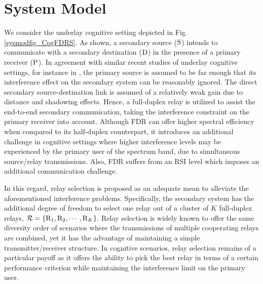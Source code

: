 \documentclass[10pt,journal]{IEEEtran}
\begin{document}
\section{System Model}
We consider the underlay cognitive setting depicted in Fig. \ref{sysmodfig_CogFDRS}. As shown, a secondary source (${\rm S}$) intends to communicate with a secondary destination (${\rm D}$) in the presence of a primary receiver (${\rm P}$). In agreement with similar recent studies of underlay cognitive settings, for instance in \cite{201102_TWC_Lee_DF}, the primary source is assumed to be far enough that its interference effect on the secondary system can be reasonably ignored. The direct secondary source-destination link is assumed of a relatively weak gain due to distance and shadowing effects. Hence, a full-duplex relay is utilized to assist the end-to-end secondary communication, taking the interference constraint on the primary receiver into account. Although \ac{FDR} can offer higher spectral efficiency when compared to its half-duplex counterpart, it introduces an additional challenge in cognitive settings where higher interference levels may be experienced by the primary user of the spectrum band, due to simultaneous source/relay transmissions. Also, \ac{FDR} suffers from an \ac{RSI} level which imposes an additional communication challenge.

In this regard, relay selection is proposed as an adequate mean to alleviate the aforementioned interference problems. Specifically, the secondary system has the additional degree of freedom to select one relay out of a cluster of $K$ full-duplex relays, ${\mathcal{R}}=\{{\rm R}_1, {\rm R}_2, \cdots, {\rm R}_K\}$. Relay selection is widely known to offer the same diversity order of scenarios where the transmissions of multiple cooperating relays are combined, yet it has the advantage of maintaining a simple transmitter/receiver structure. In cognitive scenarios, relay selection remains of a particular payoff as it offers the ability to pick the best relay in terms of a certain performance criterion while maintaining the interference limit on the primary user.
\end{document}
